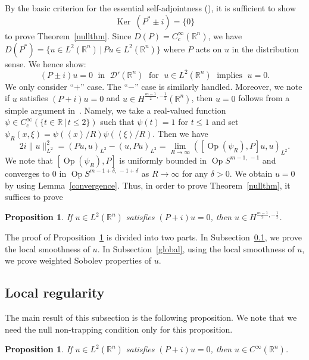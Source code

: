 \documentclass[10pt]{amsart}
\newtheorem{prop}[cdrthm]{Proposition}
\theoremstyle{definition}
\renewcommand*\d{\delta}
\newcommand*\g{\psi}
\newcommand*\x{\xi}
\DeclareMathOperator{\Op}{Op}
\newcommand*\re{\mathbb{R}}
\newcommand{\clD}{\mathcal{D}}
\DeclareMathOperator{\Ker}{Ker\;}
\newcommand{\jap}[1]{\left\langle #1 \right\rangle}
\begin{document}
By the basic criterion for the essential self-adjointness (\cite[Theorem~VII.3]{RS}), it is sufficient to show
\[
\Ker(P^* \pm i) = \bigr\{0\bigr\}
\]
to prove Theorem~\ref{nullthm}. Since $D(P) = C_c^ \infty(\re^n)$, we have $D(P^{*})=\{u\in L^2(\re^n)\,|\, Pu\in L^2(\re^n)\}$ where $P$ acts on $u$ in the distribution sense. We hence show:
\[
(P \pm i)u = 0\; \text{ in }\;\clD'(\re^n)\; \text{ for }\;u\in L^2(\re^n)\;
\text{ implies }\;u=0.
\]
We only consider ``$+$'' case. The ``$-$'' case is similarly handled. Moreover, we note if $u$ satisfies $(P+i)u=0$ and $u\in H^{\frac{m-1}{2},-\frac{1}{2}}(\re^n)$, then $u=0$ follows from a simple argument in~\cite{Va1}. Namely, we take a real-valued function $\g\in C_c^{\infty}(\{t\in \re\,|\, t\leq 2\})$ such that $\g(t)=1$ for $t\leq1$ and set $\g_{R}(x,\x)=\g(\jap{x}/R)\g(\jap{\x}/R)$. Then we have
\[
2i\|u\|_{L^2}^2=(Pu,u)_{L^2}-(u,Pu)_{L^2}=\lim_{R\to \infty}\left(\left[\Op(\g_R),P\right]u,u\right)_{L^2}.
\]
We note that $[\Op(\g_R),P]$ is uniformly bounded in $\Op S^{m-1,\,-1}$ and converges to $0$ in $\Op S^{m-1+\d,\,-1+\d}$ as $R\to \infty$ for any $\d>0$. We obtain $u=0$ by using Lemma~\ref{convergence}. Thus, in order to prove Theorem~\ref{nullthm}, it suffices to prove

\begin{prop}\label{reg}
If $u\in L^2(\re^n)$ satisfies $(P+i)u=0$, then $u \in H^{\frac{m-1}{2},-\frac{1}{2}}$.
\end{prop}

The proof of Proposition~\ref{reg} is divided into two parts. In Subsection~\ref{local}, we prove the local smoothness of $u$. In Subsection~\ref{global}, using the local smoothness of $u$, we prove weighted Sobolev properties of $u$.

\subsection{Local regularity}\label{local}

The main result of this subsection is the following proposition. We note that we need the null non-trapping condition only for this proposition.

\begin{prop}\label{locre}
If $u\in L^2(\re^n)$ satisfies $(P+i)u=0$, then $u\in C^{\infty}(\re^n)$.
\end{prop}
\end{document}
